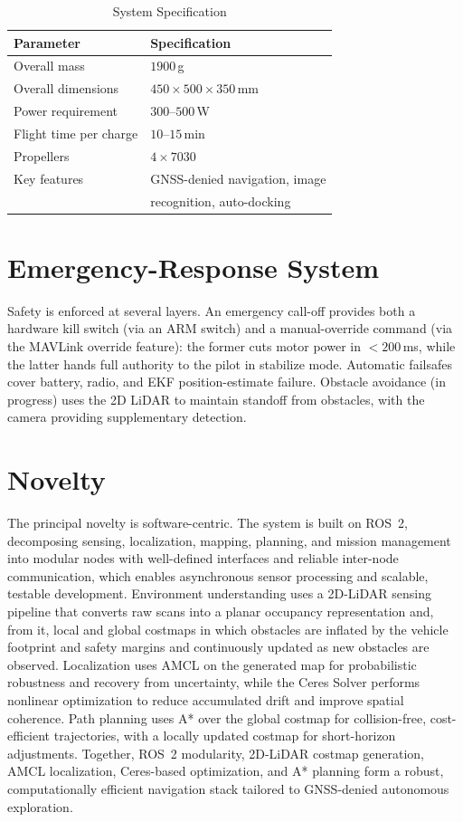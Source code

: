\documentclass[journal]{IEEEtran}
\begin{document}
\begin{table}[!t]
\centering
\caption{System Specification}
\label{tab:spec}
\begin{tabular}{ll}
\toprule
Parameter & Specification\\
\midrule
Overall mass & $1900$\,g\\
Overall dimensions & $450\times500\times350$\,mm\\
Power requirement & $300$--$500$\,W\\
Flight time per charge & $10$--$15$\,min\\
Propellers & $4\times7030$\\
Key features & GNSS-denied navigation, image\\
 & recognition, auto-docking\\
\bottomrule
\end{tabular}
\end{table}

\section{Emergency-Response System}
\label{sec:safety}
Safety is enforced at several layers. An emergency call-off provides both a
hardware kill switch (via an ARM switch) and a manual-override command (via
the MAVLink override feature): the former cuts motor power in
$<200$\,ms, while the latter hands full authority to the pilot in
stabilize mode. Automatic failsafes cover battery, radio, and EKF
position-estimate failure. Obstacle avoidance (in progress) uses the 2D
LiDAR to maintain standoff from obstacles, with the camera providing
supplementary detection.

\section{Novelty}
\label{sec:novelty}
The principal novelty is software-centric. The system is built on ROS~2,
decomposing sensing, localization, mapping, planning, and mission management
into modular nodes with well-defined interfaces and reliable inter-node
communication, which enables asynchronous sensor processing and scalable,
testable development. Environment understanding uses a 2D-LiDAR sensing
pipeline that converts raw scans into a planar occupancy representation and,
from it, local and global costmaps in which obstacles are inflated by the
vehicle footprint and safety margins and continuously updated as new
obstacles are observed. Localization uses AMCL on the generated map for
probabilistic robustness and recovery from uncertainty, while the Ceres
Solver performs nonlinear optimization to reduce accumulated drift and
improve spatial coherence. Path planning uses A* over the global costmap for
collision-free, cost-efficient trajectories, with a locally updated costmap
for short-horizon adjustments. Together, ROS~2 modularity, 2D-LiDAR costmap
generation, AMCL localization, Ceres-based optimization, and A* planning form
a robust, computationally efficient navigation stack tailored to GNSS-denied
autonomous exploration.
\end{document}

